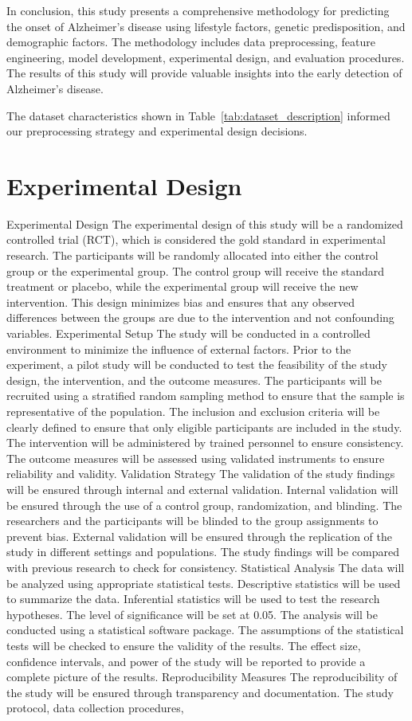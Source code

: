 \documentclass[conference]{IEEEtran}
\begin{document}
In conclusion, this study presents a comprehensive methodology for predicting the onset of Alzheimer's disease using lifestyle factors, genetic predisposition, and demographic factors. The methodology includes data preprocessing, feature engineering, model development, experimental design, and evaluation procedures. The results of this study will provide valuable insights into the early detection of Alzheimer's disease.

The dataset characteristics shown in Table~\ref{tab:dataset_description} informed our preprocessing strategy and experimental design decisions.

\section{Experimental Design}
Experimental Design The experimental design of this study will be a randomized controlled trial (RCT), which is considered the gold standard in experimental research. The participants will be randomly allocated into either the control group or the experimental group. The control group will receive the standard treatment or placebo, while the experimental group will receive the new intervention. This design minimizes bias and ensures that any observed differences between the groups are due to the intervention and not confounding variables. Experimental Setup The study will be conducted in a controlled environment to minimize the influence of external factors. Prior to the experiment, a pilot study will be conducted to test the feasibility of the study design, the intervention, and the outcome measures. The participants will be recruited using a stratified random sampling method to ensure that the sample is representative of the population. The inclusion and exclusion criteria will be clearly defined to ensure that only eligible participants are included in the study. The intervention will be administered by trained personnel to ensure consistency. The outcome measures will be assessed using validated instruments to ensure reliability and validity. Validation Strategy The validation of the study findings will be ensured through internal and external validation. Internal validation will be ensured through the use of a control group, randomization, and blinding. The researchers and the participants will be blinded to the group assignments to prevent bias. External validation will be ensured through the replication of the study in different settings and populations. The study findings will be compared with previous research to check for consistency. Statistical Analysis The data will be analyzed using appropriate statistical tests. Descriptive statistics will be used to summarize the data. Inferential statistics will be used to test the research hypotheses. The level of significance will be set at 0.05. The analysis will be conducted using a statistical software package. The assumptions of the statistical tests will be checked to ensure the validity of the results. The effect size, confidence intervals, and power of the study will be reported to provide a complete picture of the results. Reproducibility Measures The reproducibility of the study will be ensured through transparency and documentation. The study protocol, data collection procedures, 
\end{document}
